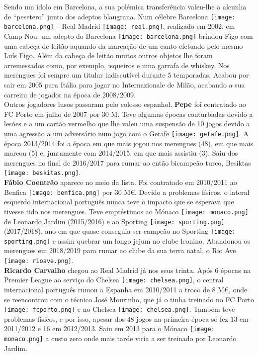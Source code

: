 \documentclass{report}
\begin{document}
Sendo um ídolo em Barcelona, a sua polémica transferência valeu-lhe a alcunha de “pesetero” junto dos adeptos blaugrana. Num célebre Barcelona \texttt{[image: barcelona.png]} – Real Madrid \texttt{[image: real.png]}, realizado em 2002, em Camp Nou, um adepto do Barcelona \texttt{[image: barcelona.png]} brindou Figo com uma cabeça de leitão aquando da marcação de um canto efetuado pelo mesmo Luís Figo. Além da cabeça de leitão muitos outros objetos lhe foram arremessados como, por exemplo, isqueiros e uma garrafa de whiskey.
Nos merengues foi sempre um titular indiscutível durante 5 temporadas. Acabou por sair em 2005 para Itália para jogar no Internazionale de Milão, acabando a sua carreira de jogador na época de 2008/2009.
\\

Outros jogadores lusos passaram pelo colosso espanhol. \textbf{Pepe} foi contratado ao FC Porto em julho de 2007 por 30 M. Teve algumas épocas conturbadas devido a lesões e a um cartão vermelho que lhe valeu uma suspensão de 10 jogos devido a uma agressão a um adversário  num jogo com o Getafe \texttt{[image: getafe.png]}. A época 2013/2014 foi a época em que mais jogou nos merengues (48), em que mais marcou (5) e, juntamente com 2014/2015, em que mais assistiu (3). Saiu dos merengues no final de 2016/2017 para rumar ao então bicampeão turco, Besiktas \texttt{[image: beskitas.png]}. 
\\

\textbf{Fábio Coentrão} aparece no meio da lista. Foi contratado em 2010/2011 ao Benfica \texttt{[image: benfica.png]} por 30 M€. Devido a problemas físicos, o lateral esquerdo internacional português nunca teve o impacto que se esperava que tivesse tido nos merengues. Teve empréstimos ao Mónaco \texttt{[image: monaco.png]} de Leonardo Jardim (2015/2016) e ao Sporting \texttt{[image: sporting.png]} (2017/2018), ano em que quase conseguia ser campeão no Sporting \texttt{[image: sporting.png]} e assim quebrar um longo jejum no clube leonino. Abandonou os merengues em 2018/2019 para rumar ao clube da sua terra natal, o Rio Ave \texttt{[image: rioave.png]}. 
\\

\textbf{Ricardo Carvalho} chegou ao Real Madrid já nos seus trinta. Após 6 épocas na Premier League ao serviço do Chelsea \texttt{[image: chelsea.png]}, o central internacional português rumou a Espanha em 2010/2011 a troco de 8 M€, onde se reencontrou com o técnico José Mourinho, que já o tinha treinado no FC Porto \texttt{[image: fcporto.png]} e no Chelsea \texttt{[image: chelsea.png]}. Também teve problemas físicos, e por isso, apesar dos 48 jogos na primeira época só fez 13 em 2011/2012 e 16 em 2012/2013. Saiu em 2013 para o Mónaco \texttt{[image: monaco.png]} a custo zero onde mais tarde viria a ser treinado por Leonardo Jardim.
\\
\end{document}
